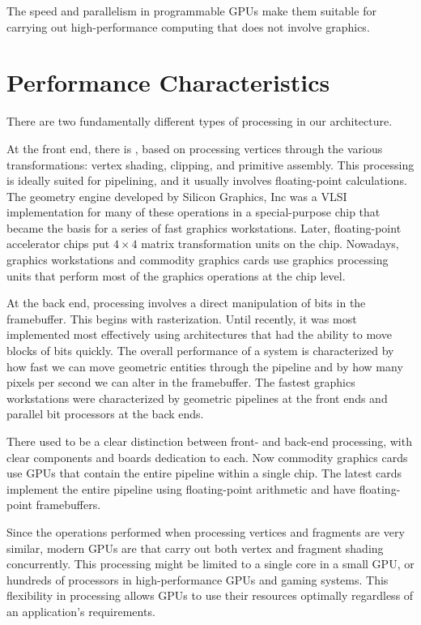 \documentclass[\main/notes.tex]{subfiles}
\begin{document}
      The speed and parallelism in programmable GPUs
      make them suitable for carrying out high-performance computing
      that does not involve graphics.

    \section{Performance Characteristics}
      There are two fundamentally different types of processing in our architecture.

      At the front end,
      there is ,
      based on processing vertices through the various transformations:
      vertex shading, clipping, and primitive assembly.
      This processing is ideally suited for pipelining,
      and it usually involves floating-point calculations.
      The geometry engine developed by Silicon Graphics, Inc
      was a VLSI implementation for many of these operations
      in a special-purpose chip that became
      the basis for a series of fast graphics workstations.
      Later, floating-point accelerator chips put
      $4 \times 4$ matrix transformation units on the chip.
      Nowadays, graphics workstations and commodity graphics cards use
      graphics processing units that perform most of the graphics operations
      at the chip level.

      At the back end,
      processing involves a direct manipulation of bits in the framebuffer.
      This begins with rasterization.
      Until recently, it was most implemented most effectively using architectures
      that had the ability to move blocks of bits quickly.
      The overall performance of a system is characterized by
      how fast we can move geometric entities through the pipeline
      and by how many pixels per second we can alter in the framebuffer.
      The fastest graphics workstations were characterized by
      geometric pipelines at the front ends
      and parallel bit processors at the back ends.

      There used to be a clear distinction between
      front- and back-end processing,
      with clear components and boards dedication to each.
      Now commodity graphics cards use GPUs that contain the entire pipeline
      within a single chip.
      The latest cards implement the entire pipeline using floating-point arithmetic
      and have floating-point framebuffers.

      Since the operations performed when processing vertices and fragments are very similar,
      modern GPUs are 
      that carry out both vertex and fragment shading concurrently.
      This processing might be limited to a single core in a small GPU,
      or hundreds of processors in high-performance GPUs and gaming systems.
      This flexibility in processing allows GPUs to use their resources optimally
      regardless of an application's requirements.
\end{document}
